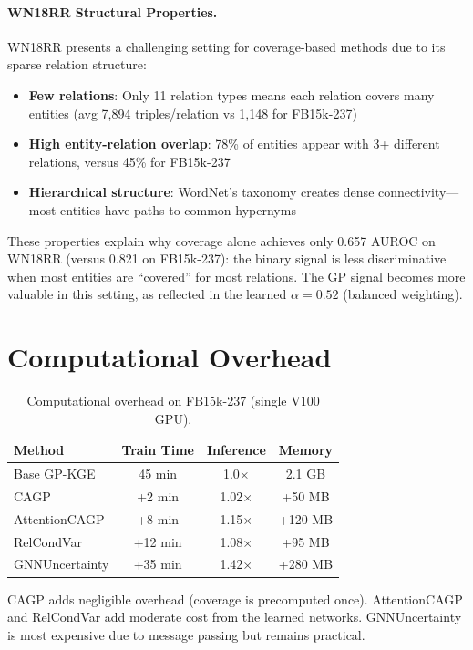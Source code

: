 \paragraph{WN18RR Structural Properties.}
WN18RR presents a challenging setting for coverage-based methods due to its sparse relation structure:
\begin{itemize}
    \item \textbf{Few relations}: Only 11 relation types means each relation covers many entities (avg 7,894 triples/relation vs 1,148 for FB15k-237)
    \item \textbf{High entity-relation overlap}: 78\% of entities appear with 3+ different relations, versus 45\% for FB15k-237
    \item \textbf{Hierarchical structure}: WordNet's taxonomy creates dense connectivity---most entities have paths to common hypernyms
\end{itemize}

These properties explain why coverage alone achieves only 0.657 AUROC on WN18RR (versus 0.821 on FB15k-237): the binary signal is less discriminative when most entities are ``covered'' for most relations.
The GP signal becomes more valuable in this setting, as reflected in the learned $\alpha = 0.52$ (balanced weighting).

\section{Computational Overhead}
\label{app:compute}

\begin{table}[h]
\centering
\caption{Computational overhead on FB15k-237 (single V100 GPU).}
\begin{tabular}{lccc}
\toprule
Method & Train Time & Inference & Memory \\
\midrule
Base GP-KGE & 45 min & 1.0$\times$ & 2.1 GB \\
CAGP & +2 min & 1.02$\times$ & +50 MB \\
AttentionCAGP & +8 min & 1.15$\times$ & +120 MB \\
RelCondVar & +12 min & 1.08$\times$ & +95 MB \\
GNNUncertainty & +35 min & 1.42$\times$ & +280 MB \\
\bottomrule
\end{tabular}
\end{table}

CAGP adds negligible overhead (coverage is precomputed once). AttentionCAGP and RelCondVar add moderate cost from the learned networks. GNNUncertainty is most expensive due to message passing but remains practical.

